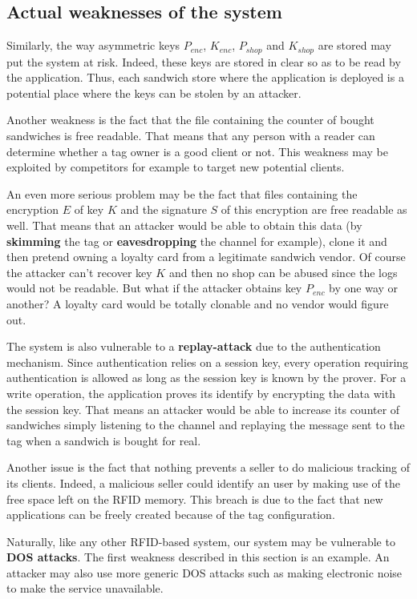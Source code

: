 \documentclass[a4paper,11pt,oneside]{article}
\begin{document}
\subsection{Actual weaknesses of the system}

Similarly, the way asymmetric keys $P_{enc}$, $K_{enc}$, $P_{shop}$ and
$K_{shop}$ are stored may put the system at risk. Indeed, these keys are stored
in clear so as to be read by the application. Thus, each sandwich store where
the application is deployed is a potential place where the keys can be stolen by
an attacker.

Another weakness is the fact that the file containing the counter of bought
sandwiches is free readable. That means that any person with a reader can
determine whether a tag owner is a good client or not. This weakness may be
exploited by competitors for example to target new potential clients.  

An even more serious problem may be the fact that files containing the
encryption $E$ of key $K$ and the signature $S$ of this encryption are free
readable as well. That means that an attacker would be able to obtain this data
(by \textbf{skimming} the tag or \textbf{eavesdropping} the channel for
example), clone it and then pretend owning a loyalty card from a legitimate
sandwich vendor. Of course the attacker can't recover key $K$ and then no shop can
be abused since the logs would not be readable. But what if the attacker obtains
key $P_{enc}$ by one way or another? A loyalty card would be totally clonable
and no vendor would figure out. 

The system is also vulnerable to a \textbf{replay-attack} due to the
authentication mechanism. Since authentication relies on a session key, every
operation requiring authentication is allowed as long as the session key is
known by the prover. For a write operation, the application proves its identify
by encrypting the data with the session key. That means an attacker would be
able to increase its counter of sandwiches simply listening to the channel and
replaying the message sent to the tag when a sandwich is bought for real. 

Another issue is the fact that nothing prevents a seller to do malicious
tracking of its clients. Indeed, a malicious seller could identify an user by
making use of the free space left on the RFID memory. This breach is due to the
fact that new applications can be freely created because of the tag
configuration. 

Naturally, like any other RFID-based system, our system may be vulnerable to
\textbf{DOS attacks}. The first weakness described in this section is an
example. An attacker may also use more generic DOS attacks such as making
electronic noise to make the service unavailable. 
\end{document}
